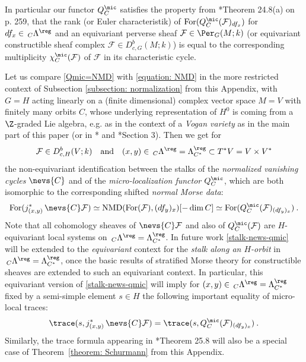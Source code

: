 \documentclass[11pt,letterpaper]{amsart}
\numberwithin{equation}{section}
\begin{document}
In particular our functor $Q^\mic_C$ satisfies the  property from \cite{ABV92}*{Theorem 24.8(a) on p. 259}, that the rank (or Euler characteristik) of $\operatorname{For}(Q^\mic_C (\mathcal{F})_{df_x})$ for $df_x\in  \,_C\Lambda^\reg$ and an equivariant perverse sheaf 
$\mathcal{F}\in \Per_{G}(M;k)$
(or equivariant constructible sheaf complex $\mathcal{F}\in D^b_{c,G}(M;k)$) is equal to the corresponding multiplicity $\chi^\mic_C(\mathcal{F})$
of $\mathcal{F}$ in its characteristic cycle.

\begin{remark} \label{rem-comparison}
Let us compare \eqref{Qmic=NMD} with \eqref{equation: NMD} in the more restricted context of Subsection \ref{subsection: normalization}
from this Appendix, with $G=H$ acting linearly on a (finite dimensional) complex vector space $M=V$ with finitely many orbits $C$, whose underlying representation of $H^0$ is coming  from a $\Z$-graded Lie algebra, e.g. as in the context of a {\it Vogan variety} as in the main part of this paper (or in \cite{Vin76}*{} and
\cite{Lus95}*{Section 3}).
Then we get for 
$$\mathcal{F}\in D^b_{c,H}(V;k) \quad \text{and} \quad (x,y)\in \,_C\Lambda^\reg = \Lambda^\reg_{C^*}\subset T^*V=V\times V^*$$
the non-equivariant identification between the stalks of the {\it normalized vanishing cycles} $ \nevs{C}$ and of the {\it micro-localization functor} $Q^\mic_C$, which are both isomorphic to the corresponding shifted {\it normal Morse data}:
\begin{equation} \label{stalk-news-qmic}
  \operatorname{For}(j_{(x,y)}^*\, \nevs{C}\mathcal{F}) \simeq   \operatorname{NMD}(\operatorname{For}(\mathcal{F}),(df_y)_x)[-\dim C]
  \simeq \operatorname{For}(Q^\mic_C (\mathcal{F})_{(df_y)_x})\:.
\end{equation} 
Note that all cohomology sheaves of $\nevs{C}\mathcal{F}$ and also of $Q^\mic_C (\mathcal{F})$ are $H$-equivariant local systems on $\,_C\Lambda^\reg = \Lambda^\reg_{C^*}$.
In future work \eqref{stalk-news-qmic} will be extended to the {\it equivariant} context for the {\it stalk along an $H$-orbit} in $\,_C\Lambda^\reg = \Lambda^\reg_{C^*}$,
once the basic results of stratified Morse theory for constructible sheaves are extended to such an equivariant context. In particular, this equivariant version of 
\eqref{stalk-news-qmic} will imply for $(x,y)\in \,_C\Lambda^\reg = \Lambda^\reg_{C^*}$ fixed by a semi-simple element $s\in H$ the following important equality of micro-local traces:
\begin{equation}\label{mic-traces}
  \trace({s},j_{(x,y)}^*\, \nevs{C}\mathcal{F})
= \trace({s},Q^\mic_C (\mathcal{F})_{(df_y)_x}) \:.  
\end{equation}
Similarly,  the trace formula appearing in \cite{ABV92}*{Theorem 25.8} will also be a special case of 
Theorem~\ref{theorem: Schurmann} from this Appendix.
\end{remark}
\end{document}

